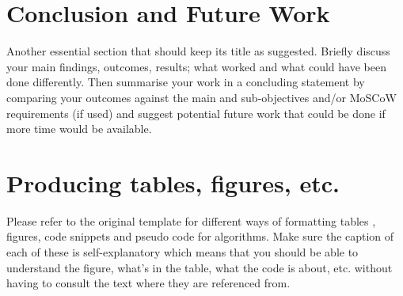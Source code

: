 \documentclass[final]{cmpreport_02}
\begin{document}
\section{Conclusion and Future Work}

Another essential section that should keep its title as suggested. Briefly discuss your main findings, outcomes, results; what worked and what could have been done differently. Then summarise your work in a concluding statement by comparing your outcomes against the main and sub-objectives and/or MoSCoW requirements (if used) and suggest potential future work that could be done if more time would be available.


\clearpage



\appendix
\clearpage
\section{Producing tables, figures, etc.} \label{sec2}
Please refer to the original template for different ways of formatting tables \cite{PCTut5}, figures, code snippets and pseudo code for algorithms. Make sure the caption of each of these is self-explanatory which means that you should be able to understand the figure, what's in the table, what the code is about, etc. without having to consult the text where they are referenced from.
\end{document}
